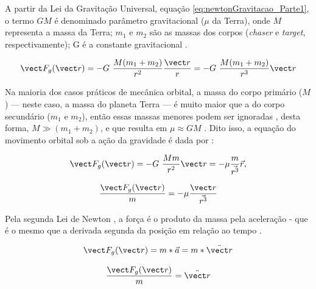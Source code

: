 A partir da Lei da Gravitação Universal, equação \eqref{eq:newtonGravitacao_Parte1}, o termo $G M$ é denominado parâmetro gravitacional ($\mu$ da Terra), onde $M$ representa a massa da Terra; $m_1$ e $m_2$ são as massas dos corpos (\textit{chaser} e \textit{target}, respectivamente); G é a constante gravitacional \cite{halliday2013,wie2008space}.

\begin{equation}
\label{eq:newtonGravitacao_Parte1}
\vect F_g(\vect r) = - G\ \frac{M(m_1+m_2)}{r^2} \frac{\vect r}{r} = - G\ \frac{M(m_1+m_2)}{r^3} {\vect r}
\end{equation}

Na maioria dos casos práticos de mecânica orbital, a massa do corpo primário ($M$) — neste caso, a massa do planeta Terra — é muito maior que a do corpo secundário ($m_1$ e $m_2$), então essas massas menores podem ser ignoradas \cite{Folta2022}, desta forma, $M \gg (m_1 + m_2)$, e que resulta em $\mu \approx GM$ \cite{wie2008space}. Dito isso, a equação do movimento orbital sob a ação da gravidade é dada por \cite{newton1713}:

\begin{equation}
\label{eq:newtonGravitacao_Parte2}
\vect F_g(\vect r) =
- G\ \frac{Mm}{r^2} {\vect r}
= -\mu \frac{m}{\vec {r^3}}\vec r,
\end{equation}
 

\begin{equation}
\label{eq:fgParte2}
\frac{\vect F_g(\vect r)}{m} = -\mu \frac{\vect r}{\vec {r^3}}
\end{equation}

Pela segunda Lei de Newton \cite{newton1713}, a força é o produto da massa pela aceleração \cite{halliday2013} - que é o mesmo que a derivada segunda da posição em relação ao tempo \cite{edelstein2018_derivadaSegunda}.

\begin{equation}
\label{eq:F=ma_Halliday2013Parte1}
\vect F_g(\vect r) = m * \vec a = m * \ddot{\vect r}
\end{equation}

\begin{equation}
\label{eq:Fma_Halliday2013_Parte2}
\frac{\vect F_g(\vect r)}{m} = \ddot{\vect r}
\end{equation}

